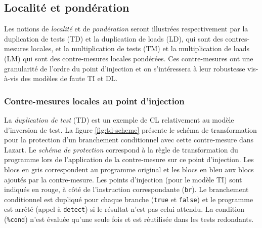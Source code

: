         \subsection{Localité et pondération}
        \label{cm-local-pond}
        
            Les notions de \textit{localité} et de \textit{pondération} seront illustrées respectivement par la duplication de tests (\gls{TD}) et la duplication de loads (\gls{LD}), qui sont des contres-mesures locales, et la multiplication de tests (\gls{TM}) et la multiplication de loads (\gls{LM}) qui sont des contre-mesures locales pondérées.
            Ces contre-mesures ont une granularité de l'ordre du point d'injection et on s'intéressera à leur robustesse vis-à-vis des modèles de faute \gls{TI} et \gls{DL}.
            
            \subsubsection{Contre-mesures locales au point d'injection}
            \label{sec:cm-local}
            
                La \textit{duplication de test} (\gls{TD}) est un exemple de \gls{CL} relativement au modèle d'inversion de test. La figure \ref{fig:td-scheme} présente le schéma de transformation pour la protection d'un branchement conditionnel avec cette contre-mesure dans Lazart. 
                Le \textit{schéma de protection} correspond à la règle de transformation du programme lors de l'application de la contre-mesure sur ce point d'injection. 
                Les blocs en gris correspondent au programme original et les blocs en bleu aux blocs ajoutés par la contre-mesure. Les points d'injection (pour le modèle \gls{TI}) sont indiqués en rouge, à côté de l'instruction correspondante (\texttt{br}).
                Le branchement conditionnel est dupliqué pour chaque branche (\texttt{true} et \texttt{false}) et le programme est arrêté (appel à \texttt{detect}) si le résultat n'est pas celui attendu.
                La condition (\texttt{\%cond}) n'est évaluée qu'une seule fois et est réutilisée dans les tests redondants.
                
